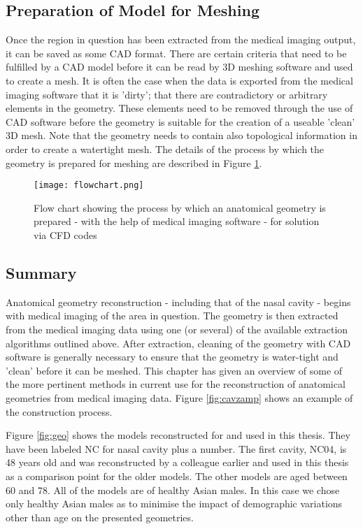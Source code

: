 \subsection{Preparation of Model for Meshing}

Once the region in question has been extracted from the medical imaging output, it can be saved as some CAD format. There are certain criteria that need to be fulfilled by a CAD model before it can be read by 3D meshing software and used to create a mesh. It is often the case when the data is exported from the medical imaging software that it is 'dirty'; that there are contradictory or arbitrary elements in the geometry. These elements need to be removed through the use of CAD software before the geometry is suitable for the creation of a useable 'clean' 3D mesh. Note that the geometry needs to contain also topological information in order to create a watertight mesh. The details of the process by which the geometry is prepared for meshing are described in Figure \ref{fig:segchart}.


\begin{figure}
  \texttt{[image: flowchart.png]}
\caption{Flow chart showing the process by which an anatomical geometry is prepared - with the help of medical imaging software - for solution via CFD codes} \label{fig:segchart}
\centering
\end{figure}
 
\subsection{Summary} 

Anatomical geometry reconstruction - including that of the nasal cavity - begins with medical imaging of the area in question. The geometry is then extracted from the medical imaging data using one (or several) of the available extraction algorithms outlined above. After extraction, cleaning of the geometry with CAD software is generally necessary to ensure that the geometry is water-tight and 'clean' before it can be meshed. This chapter has given an overview of some of the more pertinent methods in current use for the reconstruction of anatomical geometries from medical imaging data. Figure \ref{fig:cavzamp} shows an example of the construction process. 

Figure \ref{fig:geo} shows the models reconstructed for and used in this thesis. They have been labeled NC for nasal cavity plus a number. The first cavity, NC04, is 48 years old and was reconstructed by a colleague earlier and used in this thesis as a comparison point for the older models. The other models are aged between 60 and 78. All of the models are of healthy Asian males. In this case we chose only healthy Asian males as to minimise the impact of demographic variations other than age on the presented geometries.

